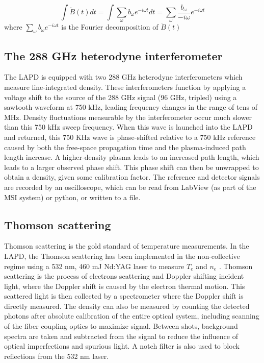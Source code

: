 \begin{equation}
	  \int \dot B(t) dt = \int \sum_\omega b_\omega e^{-i \omega t} dt = \sum_\omega \frac{b_\omega}{-i \omega} e^{-i \omega t}
\end{equation}
where $\sum_\omega b_\omega e^{-i \omega t}$ is the Fourier decomposition of $\dot B(t)$

\subsection{The 288 GHz heterodyne interferometer}

The LAPD is equipped with two 288 GHz heterodyne interferometers which measure line-integrated density. These interferometers function by applying a voltage shift to the source of the 288 GHz signal (96 GHz, tripled) using a sawtooth waveform at 750 kHz, leading frequency changes in the range of tens of MHz. Density fluctuations measurable by the interferometer occur much slower than this 750 kHz sweep frequency. When this wave is launched into the LAPD and returned, this 750 KHz wave is phase-shifted relative to a 750 kHz reference caused by both the free-space propagation time and the plasma-induced path length increase. A higher-density plasma leads to an increased path length, which leads to a larger observed phase shift. This phase shift can then be unwrapped to obtain a density, given some calibration factor. The reference and detector signals are recorded by an oscilloscope, which can be read from LabView (as part of the MSI system) or python, or written to a file.

\subsection{Thomson scattering}

Thomson scattering is the gold standard of temperature measurements. In the LAPD, the Thomson scattering has been implemented in the non-collective regime using a 532 nm, 460 mJ Nd:YAG laser to measure $T_e$ and $n_e$ \cite{ghazaryan_thomson_2022}. Thomson scattering is the process of electrons scattering and Doppler shifting incident light, where the Doppler shift is caused by the electron thermal motion. This scattered light is then collected by a spectrometer where the Doppler shift is directly measured. The density can also be measured by counting the detected photons after absolute calibration of the entire optical system, including scanning of the fiber coupling optics to maximize signal. Between shots, background spectra are taken and subtracted from the signal to reduce the influence of optical imperfections and spurious light. A notch filter is also used to block reflections from the 532 nm laser.

